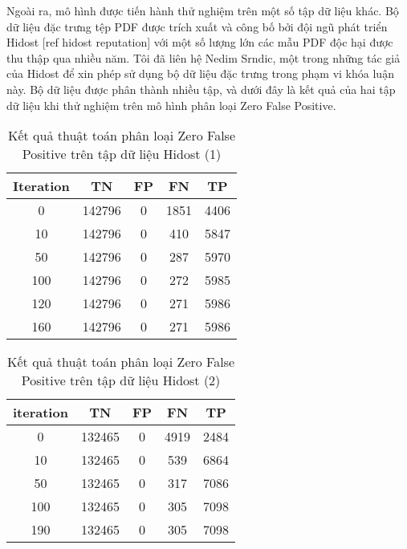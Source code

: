 \documentclass[./../main.tex]{subfiles}
\begin{document}
Ngoài ra, mô hình được tiến hành thử nghiệm trên một số tập dữ liệu khác. Bộ dữ liệu đặc trưng tệp PDF được trích xuất và công bố bởi đội ngũ phát triển Hidost [ref hidost reputation] với một số lượng lớn các mẫu PDF độc hại được thu thập qua nhiều năm. Tôi đã liên hệ Nedim Srndic, một trong những tác giả của Hidost để xin phép sử dụng bộ dữ liệu đặc trưng trong phạm vi khóa luận này. Bộ dữ liệu được phân thành nhiều tập, và dưới đây là kết quả của hai tập dữ liệu khi thử nghiệm trên mô hình phân loại Zero False Positive.

\begin{table}[]
	\centering
	\caption{Kết quả thuật toán phân loại Zero False Positive trên tập dữ liệu Hidost (1)}
	\label{tab:ket_qua_thuat_toan_phan_loai_hidost}
	\begin{tabular}{|c|c|c|c|c|}
		\hline
		\textbf{Iteration} & \textbf{TN} & \textbf{FP} & \textbf{FN} & \textbf{TP} \\ \hline
		0                  & 142796      & 0           & 1851        & 4406        \\ \hline
		10                 & 142796      & 0           & 410         & 5847        \\ \hline
		50                 & 142796      & 0           & 287         & 5970        \\ \hline
		100                & 142796      & 0           & 272         & 5985        \\ \hline
		120                & 142796      & 0           & 271         & 5986        \\ \hline
		160                & 142796      & 0           & 271         & 5986        \\ \hline
	\end{tabular}
\end{table}

\begin{table}[]
	\centering
	\caption{Kết quả thuật toán phân loại Zero False Positive trên tập dữ liệu Hidost (2)}
	\label{tab:ket_qua_thuat_toan_phan_loai_hidost_2}
	\begin{tabular}{|c|c|c|c|c|}
		\hline
		\textbf{iteration} & \textbf{TN} & \textbf{FP} & \textbf{FN} & \textbf{TP} \\ \hline
		0                  & 132465      & 0           & 4919        & 2484        \\ \hline
		10                 & 132465      & 0           & 539         & 6864        \\ \hline
		50                 & 132465      & 0           & 317         & 7086        \\ \hline
		100                & 132465      & 0           & 305         & 7098        \\ \hline
		190                & 132465      & 0           & 305         & 7098        \\ \hline
	\end{tabular}
\end{table}
\end{document}
